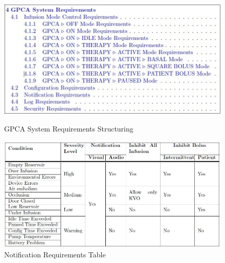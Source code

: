  \begin{figure}[h!]
    \centering
    \includegraphics[width=\columnwidth]{images/structuring.jpg}
    \caption{GPCA System Requirements Structuring}
    \label{fig:gpca-requirements}
    \vspace{0.1cm}
    \includegraphics[width=\columnwidth]{images/alarm.jpg}
    \caption{Notification Requirements Table}
    \label{fig:gpca-alarm}    
    \vspace{-0.2in}
 \end{figure}

